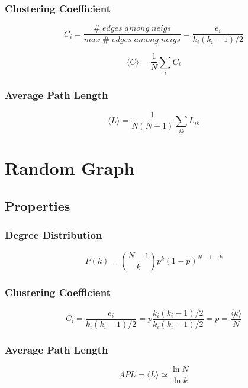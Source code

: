\documentclass[a4paper,titlepage,11pt]{article}
\begin{document}
\subsubsection{Clustering Coefficient}
\[
  C_i = \frac{\#\; edges\; among\; neigs}{max\; \# \; edges\; among \; neigs} = \frac{e_i}{k_i(k_i-1)/2}
\]

\[
  \langle C\rangle = \frac{1}{N}\sum_{i}{C_i}
\]
\subsubsection{Average Path Length}
\[
  \langle L\rangle = \frac{1}{N(N-1)}\sum_{ik}{L_{ik}}
\]

\section{Random Graph}
\subsection{Properties}
\subsubsection{Degree Distribution}
\[
  P(k) = {{N-1}\choose{k}} p^{k}(1-p)^{N-1-k}
\]
\subsubsection{Clustering Coefficient}
\[
  C_i = \frac{e_i}{k_i(k_i-1)/2} = p \frac{k_i(k_i-1)/2}{k_i(k_i-1)/2} = p = \frac{\langle k\rangle}{N} 
\]
\subsubsection{Average Path Length}
\[
  APL = \langle L\rangle \simeq \frac{\ln{N}}{\ln{k}}
\]
\end{document}
